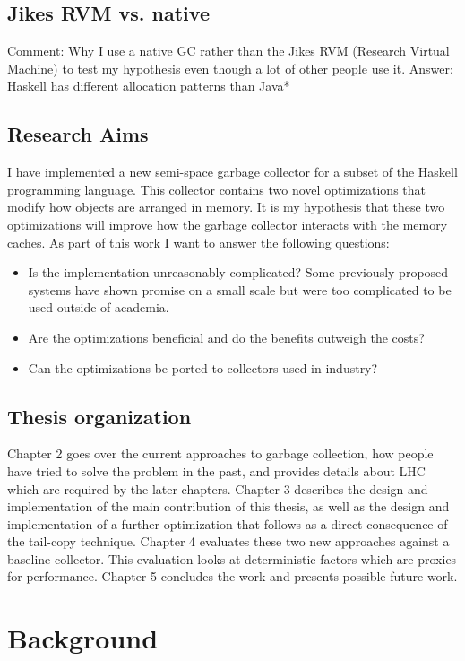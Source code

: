 \documentclass[a4paper,oneside]{memoir}
\newcommand{\makecomment}[1]{{\color{red} Comment: #1}}
\begin{document}
\section{Jikes RVM vs. native}
\makecomment{Why I use a native GC rather than the Jikes RVM (Research Virtual Machine)
to test my hypothesis even though a lot of other people use it.
Answer: Haskell has different allocation patterns than Java*}

\section{Research Aims}
I have implemented a new semi-space garbage collector for a subset of the
Haskell programming language. This collector contains two novel optimizations
that modify how objects are arranged in memory. It is my hypothesis that these
two optimizations will improve how the garbage collector interacts with the
memory caches. As part of this work I want to answer the following questions:
\begin{itemize}
  \item Is the implementation unreasonably complicated? Some previously proposed
    systems have shown promise on a small scale but were too complicated to be
    used outside of academia.
  \item Are the optimizations beneficial and do the benefits outweigh the costs?
  \item Can the optimizations be ported to collectors used in industry?
\end{itemize}

\section{Thesis organization}
Chapter 2 goes over the current approaches to garbage collection, how people
have tried to solve the problem in the past, and provides details about
LHC which are required by the later chapters.
Chapter 3 describes the design and implementation of the main contribution of
this thesis, as well as the design and implementation of a further optimization
that follows as a direct consequence of the tail-copy technique.
Chapter 4 evaluates these two new approaches against a baseline collector. This
evaluation looks at deterministic factors which are proxies for performance.
Chapter 5 concludes the work and presents possible future work.

\chapter{Background}
\end{document}
